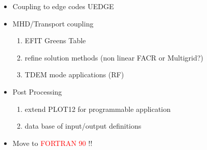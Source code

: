 \documentclass{slides}
\begin{document}
      \begin{slide}           \bf
	\begin{itemize}
           \item Coupling to edge codes \color{red}  UEDGE 
                  \color {blue}
	  \item MHD/Transport coupling
	     \begin{enumerate}
	         \item \color{red} EFIT\color{blue} Greens Table 
	         \item refine solution methods
		       (non linear FACR or Multigrid?)
                 \item TDEM mode applications (RF)
	      \end{enumerate}
           \item Post Processing
	       \begin{enumerate}
		  \item  extend \color{red} PLOT12 \color {blue} 
                        for programmable
                          application
                  \item  data base of input/output definitions
	       \end{enumerate}
           \item  Move to \textcolor{red}{ FORTRAN 90 } !!
         \end{itemize}
	\footrulewidth 6pt
      \end{slide}
\end{document}
